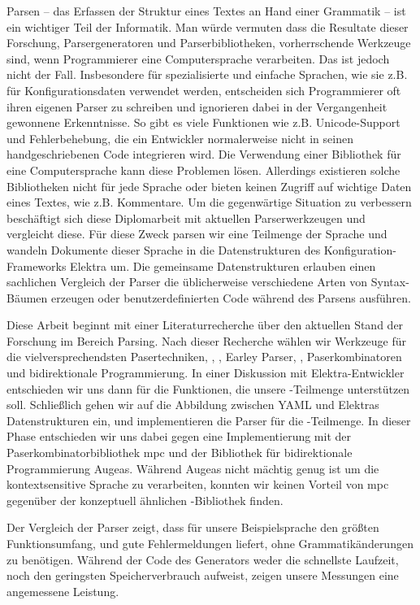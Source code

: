 \begin{kurzfassung}
Parsen – das Erfassen der Struktur eines Textes an Hand einer Grammatik – ist ein wichtiger Teil der Informatik. Man würde vermuten dass die Resultate dieser Forschung, Parsergeneratoren und Parserbibliotheken, vorherrschende Werkzeuge sind, wenn Programmierer eine Computersprache verarbeiten. Das ist jedoch nicht der Fall. Insbesondere für spezialisierte und einfache Sprachen, wie sie z.B. für Konfigurationsdaten verwendet werden, entscheiden sich Programmierer oft ihren eigenen Parser zu schreiben und ignorieren dabei in der Vergangenheit gewonnene Erkenntnisse. So gibt es viele Funktionen wie z.B. Unicode-Support und Fehlerbehebung, die ein Entwickler normalerweise nicht in seinen handgeschriebenen Code integrieren wird. Die Verwendung einer Bibliothek für eine Computersprache kann diese Problemen lösen. Allerdings existieren solche Bibliotheken nicht für jede Sprache oder bieten keinen Zugriff auf wichtige Daten eines Textes, wie z.B. Kommentare. Um die gegenwärtige Situation zu verbessern beschäftigt sich diese Diplomarbeit mit aktuellen Parserwerkzeugen und vergleicht diese. Für diese Zweck parsen wir eine Teilmenge der Sprache  und wandeln Dokumente dieser Sprache in die Datenstrukturen des Konfiguration-Frameworks Elektra um. Die gemeinsame Datenstrukturen erlauben einen sachlichen Vergleich der Parser die üblicherweise verschiedene Arten von Syntax-Bäumen erzeugen oder benutzerdefinierten Code während des Parsens ausführen.

Diese Arbeit beginnt mit einer Literaturrecherche über den aktuellen Stand der Forschung im Bereich Parsing. Nach dieser Recherche wählen wir Werkzeuge für die vielversprechendsten Pasertechniken, , , Earley Parser, , Paserkombinatoren und bidirektionale Programmierung. In einer Diskussion mit Elektra-Entwickler entschieden wir uns dann für die Funktionen, die unsere -Teilmenge unterstützen soll. Schließlich gehen wir auf die Abbildung zwischen YAML und Elektras Datenstrukturen ein, und implementieren die Parser für die -Teilmenge. In dieser Phase entschieden wir uns dabei gegen eine Implementierung mit der Paserkombinatorbibliothek mpc und der Bibliothek für bidirektionale Programmierung Augeas. Während Augeas nicht mächtig genug ist um die kontextsensitive Sprache  zu verarbeiten, konnten wir keinen Vorteil von mpc gegenüber der konzeptuell ähnlichen -Bibliothek  finden.

Der Vergleich der Parser zeigt, dass für unsere Beispielsprache  den größten Funktionsumfang, und gute Fehlermeldungen liefert, ohne Grammatikänderungen zu benötigen. Während der Code des Generators weder die schnellste Laufzeit, noch den geringsten Speicherverbrauch aufweist, zeigen unsere Messungen eine angemessene Leistung.
\end{kurzfassung}
